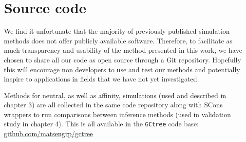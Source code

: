 \chapter{Source code}
We find it unfortunate that the majority of previously published simulation methods does not offer publicly available software.
Therefore, to facilitate as much transparency and usability of the method presented in this work, we have chosen to share all our code as open source through a Git repository.
Hopefully this will encourage non developers to use and test our methods and potentially inspire to applications in fields that we have not yet investigated.

Methods for neutral, as well as affinity, simulations (used and described in chapter 3) are all collected in the same code repository along with SCons wrappers to run comparisons between inference methods (used in validation study in chapter 4).
This is all available in the \texttt{GCtree} code base:
\url{github.com/matsengrp/gctree}

